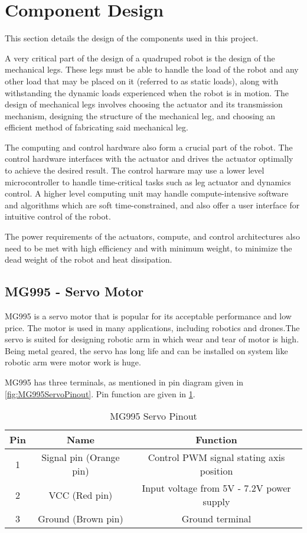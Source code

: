 \section{Component Design}

This section details the design of the components used in this project.

A very critical part of the design of a quadruped robot is the design of the mechanical legs. These legs must be able to handle the load of the robot and any other load that may be placed on it (referred to as static loads), along with withstanding the dynamic loads experienced when the robot is in motion. The design of mechanical legs involves choosing the actuator and its transmission mechanism, designing the structure of the mechanical leg, and choosing an efficient method of fabricating said mechanical leg.

The computing and control hardware also form a crucial part of the robot. The control hardware interfaces with the actuator and drives the actuator optimally to achieve the desired result. The control harware may use a lower level microcontroller to handle time-critical tasks such as leg actuator and dynamics control. A higher level computing unit may handle compute-intensive software and algorithms which are soft time-constrained, and also offer a user interface for intuitive control of the robot.

The power requirements of the actuators, compute, and control architectures also need to be met with high efficiency and with minimum weight, to minimize the dead weight of the robot and heat dissipation.


\newpage
\subsection{MG995 - Servo Motor}
MG995 is a servo motor that is popular for its acceptable performance and low price. The motor is used in many applications, including robotics and drones.The servo is suited for designing robotic arm in which wear and tear of motor is high. Being metal geared, the servo has long life and can be installed on system like robotic arm were motor work is huge.

MG995 has three terminals, as mentioned in pin diagram given in \ref{fig:MG995ServoPinout}. Pin function are given in \ref{table:MG995PinOut}.

\begin{table}[H]
\centering
    \begin{tabular}{ |c|c|c| } 
    \hline
    Pin & Name & Function\\
    \hline 
    1 & Signal pin (Orange pin) & Control PWM signal stating axis position\\
    2 & VCC (Red pin) & Input voltage from 5V - 7.2V power supply\\ 
    3 & Ground (Brown pin) & Ground terminal\\ 
    \hline
    \end{tabular}
    \caption{MG995 Servo Pinout}    
    \label{table:MG995PinOut}
\end{table}    
    
